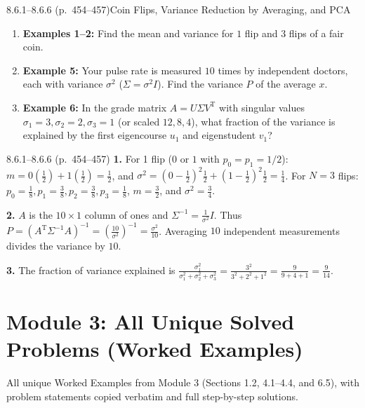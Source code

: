 \documentclass[11pt,a4paper,openany,oneside]{book}
\def\vect#1{#1}%
\def\uv#1{#1}%
\def\mathbf#1{#1}%
\newcommand{\vect}[1]{\mathbf{#1}}
\newcommand{\uv}[1]{\hat{\mathbf{#1}}}
\newcommand{\T}{\mathrm{T}}
\numberwithin{equation}{chapter}
\begin{document}
\begin{example}{8.6.1--8.6.6 (p.\ 454--457)}{Coin Flips, Variance Reduction by Averaging, and PCA}
\begin{enumerate}
\item \textbf{Examples 1--2:} Find the mean and variance for $1$ flip and $3$ flips of a fair coin.
\item \textbf{Example 5:} Your pulse rate is measured $10$ times by independent doctors, each with variance $\sigma^2$ ($\Sigma = \sigma^2 I$). Find the variance $P$ of the average $\uv{x}$.
\item \textbf{Example 6:} In the grade matrix $A = U\Sigma V^\T$ with singular values $\sigma_1=3, \sigma_2=2, \sigma_3=1$ (or scaled $12, 8, 4$), what fraction of the variance is explained by the first eigencourse $\vect{u}_1$ and eigenstudent $\vect{v}_1$?
\end{enumerate}
\end{example}

\vfill
\begin{pageend_sol}{8.6.1--8.6.6 (p.\ 454--457)}
\textbf{1.} For 1 flip ($0$ or $1$ with $p_0=p_1=1/2$): $m = 0(\frac{1}{2})+1(\frac{1}{2}) = \frac{1}{2}$, and $\sigma^2 = (0-\frac{1}{2})^2\frac{1}{2} + (1-\frac{1}{2})^2\frac{1}{2} = \frac{1}{4}$. For $N=3$ flips: $p_0=\frac{1}{8}, p_1=\frac{3}{8}, p_2=\frac{3}{8}, p_3=\frac{1}{8}$, $m = \frac{3}{2}$, and $\sigma^2 = \frac{3}{4}$.

\textbf{2.} $A$ is the $10\times 1$ column of ones and $\Sigma^{-1} = \frac{1}{\sigma^2}I$. Thus $P = (A^\T\Sigma^{-1}A)^{-1} = \left(\frac{10}{\sigma^2}\right)^{-1} = \frac{\sigma^2}{10}$. Averaging $10$ independent measurements divides the variance by $10$.

\textbf{3.} The fraction of variance explained is $\frac{\sigma_1^2}{\sigma_1^2 + \sigma_2^2 + \sigma_3^2} = \frac{3^2}{3^2 + 2^2 + 1^2} = \frac{9}{9 + 4 + 1} = \frac{9}{14}$.
\end{pageend_sol}
\clearpage

\chapter[Module 3: Unique Solved Problems]{Module 3: All Unique Solved Problems (Worked Examples)}

\begin{syll}
All unique Worked Examples from Module 3 (Sections 1.2, 4.1--4.4, and 6.5), with problem statements copied verbatim and full step-by-step solutions.
\end{syll}
\end{document}
